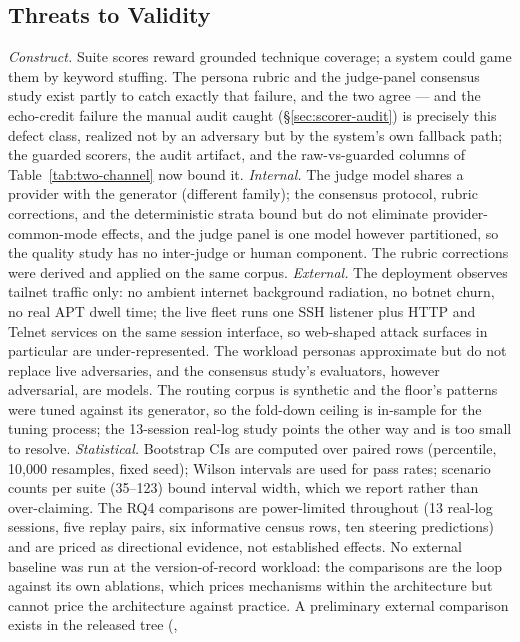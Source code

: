 \subsection{Threats to Validity}
\label{sec:threats}

\emph{Construct.} Suite scores reward grounded technique coverage; a
system could game them by keyword stuffing. The persona rubric and the
judge-panel consensus study exist partly to catch exactly that failure,
and the two agree --- and the echo-credit failure the manual audit
caught (\S\ref{sec:scorer-audit}) is precisely this defect class,
realized not by an adversary but by the system's own fallback path; the
guarded scorers, the audit artifact, and the raw-vs-guarded columns of
Table~\ref{tab:two-channel} now bound it. \emph{Internal.} The judge model shares a provider with the generator (different family); the consensus protocol, rubric
corrections, and the deterministic strata bound but do not eliminate
provider-common-mode effects, and the judge panel is one model however
partitioned, so the quality study has no inter-judge or human
component. The rubric corrections were derived and applied on the same
corpus. \emph{External.} The deployment observes tailnet traffic only: no ambient internet background
radiation, no botnet churn, no real APT dwell time; the live fleet runs
one SSH listener plus HTTP and Telnet services on the same session
interface, so web-shaped attack surfaces in particular are
under-represented. The workload personas approximate
but do not replace live adversaries, and the consensus study's
evaluators, however adversarial, are models. The routing corpus is
synthetic and the floor's patterns were tuned against its generator, so
the fold-down ceiling is in-sample for the tuning process; the 13-session
real-log study points the other way and is too small to resolve.
\emph{Statistical.}
Bootstrap CIs are computed over paired rows (percentile, 10{,}000
resamples, fixed seed); Wilson intervals are used for pass rates;
scenario counts per suite
(35--123) bound interval width, which we report rather than
over-claiming. The RQ4 comparisons are power-limited throughout (13
real-log sessions, five replay pairs, six informative census rows, ten
steering predictions) and are priced as directional evidence, not
established effects. No external baseline was run at the
version-of-record workload: the comparisons are the loop against its
own ablations, which prices mechanisms within the architecture but
cannot price the architecture against practice. A preliminary external
comparison exists in the released tree (,
